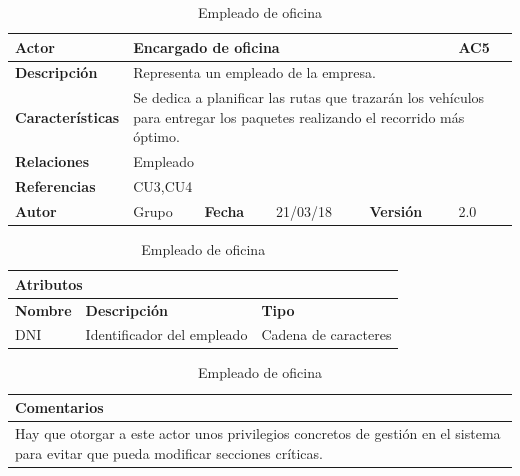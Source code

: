 \documentclass[12pt,spanish]{article}
\begin{document}
\begin{table}[H]

\centering
\begin{tabular}{|m{3cm}|m{4cm}|m{2cm}|m{2cm}|m{2cm}|m{1cm}|}
\hline
\textbf{Actor} &  \multicolumn{4}{m{8cm}|}{Encargado de oficina} \vline &  \cellcolor{gray!40}AC5 \\
\hline
\textbf{Descripción} & \multicolumn{5}{m{8cm}|}{Representa un empleado de la empresa.} \\
\hline
\textbf{Características} & \multicolumn{5}{m{8cm}|}{Se dedica a planificar las rutas que trazarán los vehículos para entregar los paquetes realizando el recorrido más óptimo.} \\
\hline
\textbf{Relaciones} &\multicolumn{5}{m{8cm}|}{Empleado} \\
\hline
\textbf{Referencias} & \multicolumn{5}{m{8cm}|}{CU3,CU4} \\
\hline
\textbf{Autor} & Grupo & \textbf{Fecha} & 21/03/18 & \textbf{Versión} & 2.0 \\
\hline
\end{tabular}

\vspace{1cm}

\begin{tabular}{|m{4cm}|m{7.3cm}|m{4cm}|}
\hline
\multicolumn{3}{|m{15.3cm}|}{\textbf{Atributos}} \\
\hline
\textbf{Nombre} & \textbf{Descripción} & \textbf{Tipo} \\
\hline
DNI & Identificador del empleado & Cadena de caracteres \\
\hline
\end{tabular}


\vspace{1cm}

\begin{tabular}{|m{16.2cm}|}
\hline
\textbf{Comentarios} \\
\hline
Hay que otorgar a este actor unos privilegios concretos de gestión en el sistema para evitar que pueda modificar secciones críticas. \\
\hline
\end{tabular}

\caption{Empleado de oficina}

\end{table}
\end{document}
